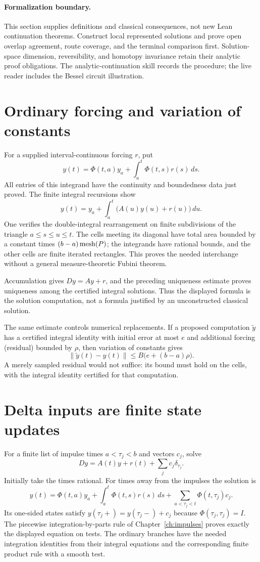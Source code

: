 \paragraph{Formalization boundary.}
This section supplies definitions and classical consequences, not new Lean
continuation theorems. Construct local represented solutions and prove open
overlap agreement, route coverage, and the terminal comparison first.
Solution-space dimension, reversibility, and homotopy invariance retain
their analytic proof obligations. The analytic-continuation skill records
the procedure; the live reader includes the Bessel circuit illustration.

\section{Ordinary forcing and variation of constants}
For a supplied interval-continuous forcing $r$, put
\[
 y(t)=\Phi(t,a)y_a+\int_a^t\Phi(t,s)r(s)\,ds.
\]
All entries of this integrand have the continuity and boundedness data just
proved.  The finite integral recursions show
\[
 y(t)=y_a+\int_a^t\bigl(A(u)y(u)+r(u)\bigr)\,du.
\]
One verifies the double-integral rearrangement on finite subdivisions of
the triangle $a\le s\le u\le t$.  The cells meeting its diagonal have
total area bounded by a constant times $(b-a)\operatorname{mesh}(P)$; the integrands
have rational bounds, and the other cells are finite iterated rectangles.
This proves the needed interchange without a general measure-theoretic
Fubini theorem.

Accumulation gives $Dy=Ay+r$, and the preceding uniqueness estimate proves
uniqueness among the certified integral solutions.  Thus the displayed
formula is the solution computation, not a formula justified by an
unconstructed classical solution.

The same estimate controls numerical replacements.  If a proposed
computation $\widetilde y$ has a certified integral identity with initial
error at most $e$ and additional forcing (residual) bounded by $\rho$,
then variation of constants gives
\[
 \|\widetilde y(t)-y(t)\|\le B\bigl(e+(b-a)\rho\bigr).
\]
A merely sampled residual would not suffice: its bound must hold on the
cells, with the integral identity certified for that computation.

\section{Delta inputs are finite state updates}
For a finite list of impulse times $a<\tau_j<b$ and vectors $c_j$, solve
\[
 Dy=A(t)y+r(t)+\sum_jc_j\delta_{\tau_j}.
\]
Initially take the times rational.  For times away from the impulses the
solution is
\[
 \boxed{y(t)=\Phi(t,a)y_a+\int_a^t\Phi(t,s)r(s)\,ds
                  +\sum_{a<\tau_j<t}\Phi(t,\tau_j)c_j.}
\]
Its one-sided states satisfy
$y(\tau_j+)=y(\tau_j-)+c_j$ because $\Phi(\tau_j,\tau_j)=I$.
The piecewise integration-by-parts rule of Chapter~\ref{ch:impulses}
proves exactly the displayed equation on tests.  The ordinary branches
have the needed integration identities from their integral equations and
the corresponding finite product rule with a smooth test.

